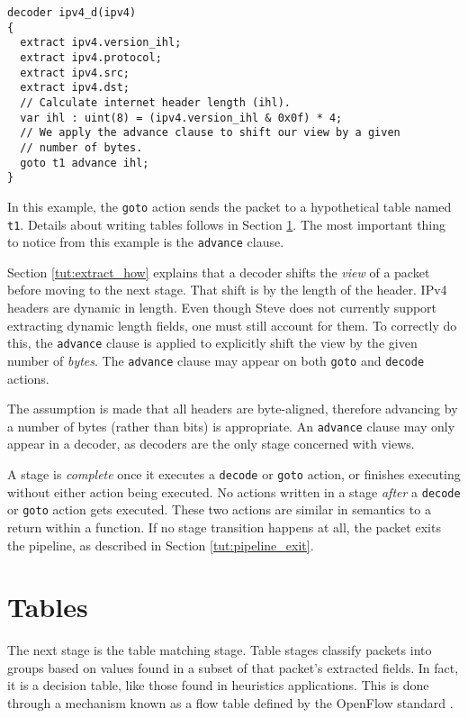 \begin{codepage}
\begin{lstlisting}
decoder ipv4_d(ipv4)
{
  extract ipv4.version_ihl;
  extract ipv4.protocol;
  extract ipv4.src;
  extract ipv4.dst;
  // Calculate internet header length (ihl).
  var ihl : uint(8) = (ipv4.version_ihl & 0x0f) * 4;
  // We apply the advance clause to shift our view by a given
  // number of bytes.
  goto t1 advance ihl;
}
\end{lstlisting}
\end{codepage}

In this example, the \texttt{goto} action sends the packet to a hypothetical table
named \texttt{t1}. Details about writing tables follows in Section \ref{tut:table}. The most important thing to notice from this example is the
\texttt{advance} clause.

Section \ref{tut:extract_how} explains that a decoder shifts the
\textit{view} of a packet before moving to the next stage. That shift is by the
length of the header. IPv4 headers are dynamic in length. Even though Steve does not
currently support extracting dynamic length fields, one must still account for
them. To correctly do this, the \texttt{advance} clause is applied to
explicitly shift the view by the given number of \textit{bytes}. The
\texttt{advance} clause may appear on both \texttt{goto} and \texttt{decode} actions.

The assumption is made that all headers are byte-aligned, therefore advancing by
a number of bytes (rather than bits) is appropriate. An
\texttt{advance} clause may only appear in a decoder, as decoders are the only
stage concerned with views.

A stage is \textit{complete} once it executes a \texttt{decode} or \texttt{goto} action, or
finishes executing without either action being executed. No actions written in a stage
\textit{after} a \texttt{decode} or \texttt{goto} action gets executed. These two actions are similar in
semantics to a return within a function. If no stage transition happens at all,
the packet exits the pipeline, as described in Section \ref{tut:pipeline_exit}.

\section{Tables} \label{tut:table}

The next stage is the table matching stage. 
Table stages classify packets into groups based on values found in a subset of that packet's extracted fields. In fact, it is a decision table, like those found in heuristics applications. This is done
through a mechanism known as a flow table defined by the OpenFlow standard
\cite{openflow_spec}.

